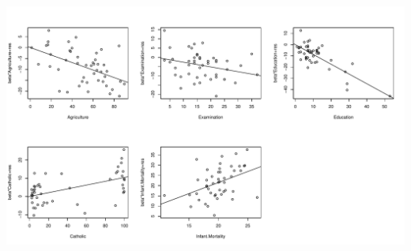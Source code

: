 \documentclass{homework}
\begin{document}
\begin{longproblem}
\includegraphics[width=\textwidth]{partial_residual_plots1.pdf}
\end{longproblem}
\end{document}
